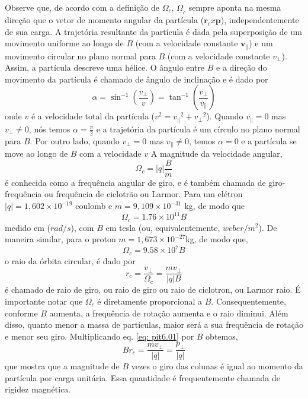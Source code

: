 \documentclass[12pt,oneside,a4paper]{abntex2}
\begin{document}
Observe que, de acordo com a definição de $\Omega_c$,  $\underline{\Omega}_c$ sempre aponta na mesma direção que o vetor de momento angular da partícula ($\bm{r}_c x \bm{p}$), independentemente de sua carga.
A trajetória resultante da partícula é dada pela superposição de um movimento uniforme ao longo de $B$ (com a velocidade constante $\bm{v}_{\|}$) e um movimento circular no plano normal para $B$ (com a velocidade constante $v_{\bot}$). Assim, a partícula descreve uma hélice. O ângulo entre $B$ e a direção do movimento da partícula é chamado de ângulo de inclinação e é dado por
\begin{equation}
\alpha = \sin^{-1}{(\frac{v_{\bot}}{v})} = \tan^{-1}{(\frac{v_{\bot}}{v_{\|}})}
\end{equation}
onde $v$ é a velocidade total da partícula ($v^2 = {v_{\|}}^2 + {v_{\bot}}^2$). Quando $v_{\|} = 0$
mas $v_{\bot} \neq 0$, nós temos $\alpha = \frac{\pi}{2}$ e a trajetória da partícula é um círculo no
plano normal para $B$. Por outro lado, quando $v_{\bot} = 0$ mas $v_{\|} \neq 0$, temos
 $\alpha = 0$ e a partícula se move ao longo de $B$ com a velocidade $v$
A magnitude da velocidade angular,
\begin{equation}
\Omega_c = |q|\frac{B}{m}
\end{equation}
é conhecida como a frequência angular de giro, e é também chamada de giro-frequência ou frequência de ciclotrão ou Larmor. Para um elétron $|q| = 1,602 \times 10^{-19}$ coulomb e $m = 9,109 \times 10^{-31}$ kg, de modo que
\begin{equation}
\Omega_c = 1.76 \times 10^{11} B
\end{equation}
medido em ($rad/s$), com $B$ em tesla (ou, equivalentemente, $weber/m^2$).
De maneira similar, para o proton $m = 1,673 \times 10^{-27}$kg, de modo que,
\begin{equation}
\Omega_c = 9.58 \times 10^7 B
\end{equation}
o raio da órbita circular, é dado por
\begin{equation}
\label{eq: pit6.02}
r_c = \frac{v_{\bot}}{\Omega_c} = \frac{m v_{\bot}}{|q|B}
\end{equation}
é chamado de raio de giro, ou raio de giro ou raio de ciclotron, ou Larmor raio. É importante notar que $\Omega_c$ é diretamente proporcional a $B$. Consequentemente, conforme $B$ aumenta, a frequência de rotação aumenta e
o raio diminui. Além disso, quanto menor a massa de partículas, maior será a
sua frequência de rotação e menor seu giro. Multiplicando eq. \ref{eq: pit6.01} por $B$ obtemos,
\begin{equation}
B r_c = \frac{m v_{\bot}}{|q|} = \frac{p_{\bot}}{|q|}
\end{equation}
que mostra que a magnitude de $B$ vezes o giro das colunas é igual ao momento da partícula por carga unitária. Essa quantidade é frequentemente chamada de rigidez magnética.
\end{document}
